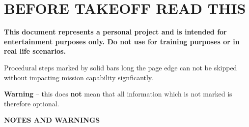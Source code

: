 \dominitoc
\tableofcontents

\chapter*{BEFORE TAKEOFF READ THIS}

\begin{tcolorbox}[
    enhanced, colback=white, colframe=color1, colbacktitle=white, coltitle=color1, sharp corners, attach boxed title to top center={yshift=2mm},
    boxed title style={
        sharp corners,
        drop shadow=color1!100
    }, title=\LARGE\textbf{DISCLAIMER}
]
    \textbf{This document represents a personal project and is intended for entertainment purposes only. Do not use for training purposes or in real life scenarios.}
\end{tcolorbox}

\bigskip

\begin{multicols}{2}
    
    \medskip

    Procedural steps marked by solid bars long the page edge can not be skipped without impacting mission capability signficantly.

    \medskip 

    \textbf{Warning} -- this does \textbf{not} mean that all information which is not marked is therefore optional.
    \cbend 

    \vfill\null
    \columnbreak

    {\Large\textbf{NOTES AND WARNINGS}}


\end{multicols}

\cleardoublepage